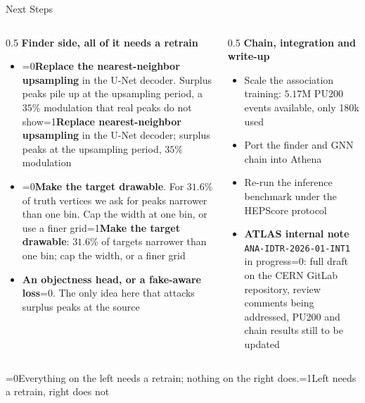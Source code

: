 \documentclass[xcolor=table,aspectratio=169]{beamer}
\providecommand{\talkbuild}{0}
\newcommand{\readingonly}[1]{\ifnum\talkbuild=0\relax#1\fi}
\newcommand{\talkonly}[1]{\ifnum\talkbuild=1\relax#1\fi}
\begin{document}
\begin{frame}{Next Steps}
    \begin{columns}[t]
        \begin{column}{0.5\linewidth}
            \textbf{Finder side, all of it needs a retrain}
            \begin{itemize}
                \setlength\itemsep{0.5em}
                \item \small \readingonly{\textbf{Replace the nearest-neighbor upsampling} in the
                    U-Net decoder. Surplus peaks pile up at the upsampling period, a
                    $35\%$ modulation that real peaks do not show}\talkonly{\textbf{Replace nearest-neighbor
                    upsampling} in the U-Net decoder; surplus peaks at the upsampling period,
                    $35\%$ modulation}
                \item \small \readingonly{\textbf{Make the target drawable}. For $31.6\%$ of truth
                    vertices we ask for peaks narrower than one bin. Cap the width at one
                    bin, or use a finer grid}\talkonly{\textbf{Make the target drawable}: $31.6\%$
                    of targets narrower than one bin; cap the width, or a finer grid}
                \item \small \textbf{An objectness head, or a fake-aware loss}\readingonly{.
                    The only idea here that attacks surplus peaks at the
                    source}
            \end{itemize}
        \end{column}
        \begin{column}{0.5\linewidth}
            \textbf{Chain, integration and write-up}
            \begin{itemize}
                \setlength\itemsep{0.5em}
                \item \small Scale the association training: $5.17$M PU200 events
                    available, only 180k used
                \item \small Port the finder and GNN chain into Athena
                \item \small Re-run the inference benchmark under the HEPScore protocol
                \item \small \textbf{ATLAS internal note}
                    \texttt{ANA-IDTR-2026-01-INT1} in progress\readingonly{: full draft
                    on the CERN GitLab repository, review comments being addressed,
                    PU200 and chain results still to be updated}
            \end{itemize}
        \end{column}
    \end{columns}
    \vspace{0.5em}
    \centering
    {\small\textcolor{black!60}{\readingonly{Everything on the left needs a retrain; nothing on the
    right does.}\talkonly{Left needs a retrain, right does not}}}
\end{frame}
\end{document}
